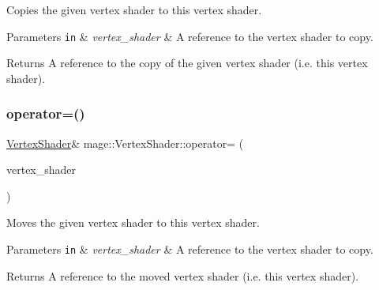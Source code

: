 Copies the given vertex shader to this vertex shader.


\begin{DoxyParams}[1]{Parameters}
\mbox{\tt in}  & {\em vertex\+\_\+shader} & A reference to the vertex shader to copy. \\
\hline
\end{DoxyParams}
\begin{DoxyReturn}{Returns}
A reference to the copy of the given vertex shader (i.\+e. this vertex shader). 
\end{DoxyReturn}
\hypertarget{classmage_1_1_vertex_shader_ada6250a89610e5649e0062c9a50fb78a}{}\label{classmage_1_1_vertex_shader_ada6250a89610e5649e0062c9a50fb78a} 
\subsubsection{\texorpdfstring{operator=()}{operator=()}\hspace{0.1cm}{\footnotesize\ttfamily [2/2]}}
{\footnotesize\ttfamily \hyperlink{classmage_1_1_vertex_shader}{Vertex\+Shader}\& mage\+::\+Vertex\+Shader\+::operator= (\begin{DoxyParamCaption}\item[{\hyperlink{classmage_1_1_vertex_shader}{Vertex\+Shader} \&\&}]{vertex\+\_\+shader }\end{DoxyParamCaption})\hspace{0.3cm}{\ttfamily [delete]}}

Moves the given vertex shader to this vertex shader.


\begin{DoxyParams}[1]{Parameters}
\mbox{\tt in}  & {\em vertex\+\_\+shader} & A reference to the vertex shader to copy. \\
\hline
\end{DoxyParams}
\begin{DoxyReturn}{Returns}
A reference to the moved vertex shader (i.\+e. this vertex shader). 
\end{DoxyReturn}
\hypertarget{classmage_1_1_vertex_shader_a4ddc010c355523fee4f04930bd0285ed}{}\label{classmage_1_1_vertex_shader_a4ddc010c355523fee4f04930bd0285ed} 
